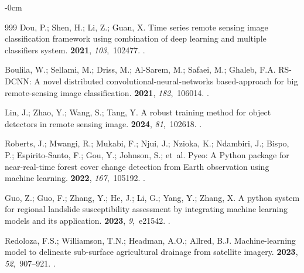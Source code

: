 \documentclass[coasts,article,accept,pdftex,oneauthor]{Definitions/mdpi}
\begin{document}
\begin{adjustwidth}{-\extralength}{0cm}
\begin{thebibliography}{999}
Dou, P.; Shen, H.; Li, Z.; Guan, X.
\newblock Time series remote sensing image classification framework using
  combination of deep learning and multiple classifiers system.
 {\bf 2021}, {\em 103},~102477.
.

Boulila, W.; Sellami, M.; Driss, M.; Al-Sarem, M.; Safaei, M.; Ghaleb, F.A.
\newblock RS-DCNN: A novel distributed convolutional-neural-networks
  based-approach for big remote-sensing image classification.
 {\bf 2021}, {\em
  182},~106014.
.

Lin, J.; Zhao, Y.; Wang, S.; Tang, Y.
\newblock A robust training method for object detectors in remote sensing
  image.
 {\bf 2024}, {\em 81},~102618.
.

Roberts, J.; Mwangi, R.; Mukabi, F.; Njui, J.; Nzioka, K.; Ndambiri, J.; Bispo,
  P.; Espirito-Santo, F.; Gou, Y.; Johnson, S.;  et~al.
\newblock Pyeo: A Python package for near-real-time forest cover change
  detection from Earth observation using machine learning.
 {\bf 2022}, {\em 167},~105192.
.

Guo, Z.; Guo, F.; Zhang, Y.; He, J.; Li, G.; Yang, Y.; Zhang, X.
\newblock A python system for regional landslide susceptibility assessment by
  integrating machine learning models and its application.
 {\bf 2023}, {\em 9},~e21542.
.

Redoloza, F.S.; Williamson, T.N.; Headman, A.O.; Allred, B.J.
\newblock Machine-learning model to delineate sub-surface agricultural drainage
  from satellite imagery.
 {\bf 2023}, {\em
  52},~907--921.
.


\end{thebibliography}
\end{adjustwidth}
\end{document}
